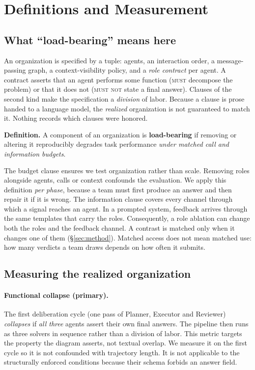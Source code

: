 \section{Definitions and Measurement}
\label{sec:framework}

\subsection{What ``load-bearing'' means here}

An organization is specified by a tuple: agents, an interaction order, a
message-passing graph, a context-visibility policy, and a \emph{role
contract} per agent. A contract asserts that an agent performs some function
(\textsc{must} decompose the problem) or that it does not (\textsc{must not}
state a final answer). Clauses of the second kind make the specification a
\emph{division} of labor. Because a clause is prose handed to a language
model, the \emph{realized} organization is not guaranteed to match it.
Nothing records which clauses were honored.

\textbf{Definition.} A component of an organization is \textbf{load-bearing}
if removing or altering it reproducibly degrades task performance
\emph{under matched call and information budgets}.

The budget clause ensures we test organization rather than scale. Removing
roles alongside agents, calls or context confounds the evaluation. We apply
this definition \emph{per phase}, because a team must first produce an
answer and then repair it if it is wrong. The information clause covers
every channel through which a signal reaches an agent. In a prompted system,
feedback arrives through the same templates that carry the roles.
Consequently, a role ablation can change both the roles and the feedback
channel. A contrast is matched only when it changes one of them
(\S\ref{sec:method}). Matched access does not mean matched use: how many
verdicts a team draws depends on how often it submits.

\subsection{Measuring the realized organization}

\paragraph{Functional collapse (primary).} The first deliberation cycle (one
pass of Planner, Executor and Reviewer) \emph{collapses} if \emph{all three}
agents assert their own final answers. The pipeline then runs
as three solvers in sequence rather than a division of labor. This metric
targets the property the diagram asserts, not textual overlap. We
measure it on the first cycle so it is not confounded with trajectory
length. It is not applicable to the structurally enforced conditions because
their schema forbids an answer field.


